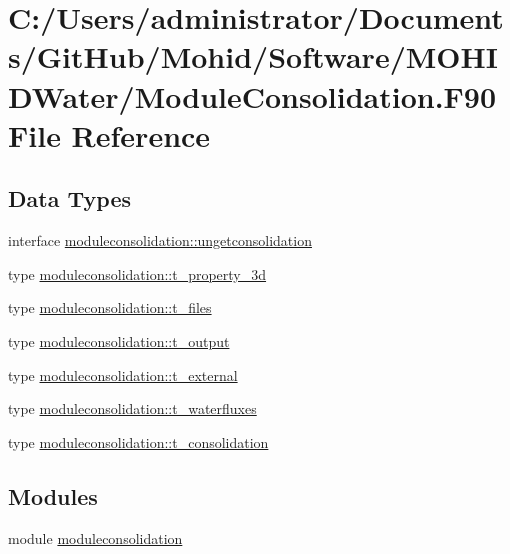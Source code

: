 \hypertarget{_module_consolidation_8_f90}{}\section{C\+:/\+Users/administrator/\+Documents/\+Git\+Hub/\+Mohid/\+Software/\+M\+O\+H\+I\+D\+Water/\+Module\+Consolidation.F90 File Reference}
\label{_module_consolidation_8_f90}
\subsection*{Data Types}
\begin{DoxyCompactItemize}
\item 
interface \mbox{\hyperlink{interfacemoduleconsolidation_1_1ungetconsolidation}{moduleconsolidation\+::ungetconsolidation}}
\item 
type \mbox{\hyperlink{structmoduleconsolidation_1_1t__property__3d}{moduleconsolidation\+::t\+\_\+property\+\_\+3d}}
\item 
type \mbox{\hyperlink{structmoduleconsolidation_1_1t__files}{moduleconsolidation\+::t\+\_\+files}}
\item 
type \mbox{\hyperlink{structmoduleconsolidation_1_1t__output}{moduleconsolidation\+::t\+\_\+output}}
\item 
type \mbox{\hyperlink{structmoduleconsolidation_1_1t__external}{moduleconsolidation\+::t\+\_\+external}}
\item 
type \mbox{\hyperlink{structmoduleconsolidation_1_1t__waterfluxes}{moduleconsolidation\+::t\+\_\+waterfluxes}}
\item 
type \mbox{\hyperlink{structmoduleconsolidation_1_1t__consolidation}{moduleconsolidation\+::t\+\_\+consolidation}}
\end{DoxyCompactItemize}
\subsection*{Modules}
\begin{DoxyCompactItemize}
\item 
module \mbox{\hyperlink{namespacemoduleconsolidation}{moduleconsolidation}}
\end{DoxyCompactItemize}
